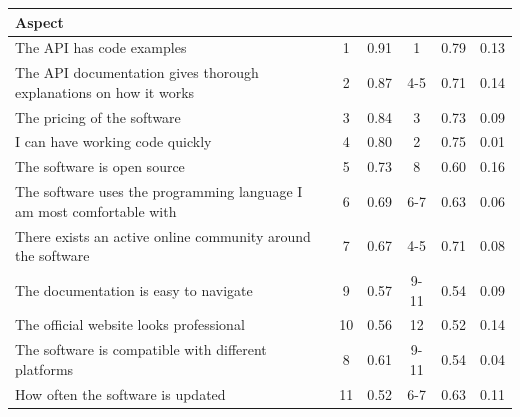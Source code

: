 \documentclass{article}
\begin{document}
\begin{table}[H]
\centering
\begin{tabularx}{\columnwidth}{X|c:c|c:c|c|}

\textbf{Aspect}                                                    &     & &   & & \\ \hline
The API has code examples                                             &               1 & 0.91       &            1 & 0.79           & 0.13  \\ \hline
The API documentation gives thorough explanations on how it works     &               2 & 0.87       &          4-5 & 0.71           & 0.14  \\ \hline
The pricing of the software                                           &               3 & 0.84       &            3 & 0.73           & 0.09  \\ \hline
I can have working code quickly                                       &               4 & 0.80       &            2 & 0.75           & 0.01  \\ \hline
The software is open source                                           &               5 & 0.73       &            8 & 0.60           & 0.16  \\ \hline
The software uses the programming language I am most comfortable with &               6 & 0.69       &          6-7 & 0.63           & 0.06  \\ \hline
There exists an active online community around the software           &               7 & 0.67       &          4-5 & 0.71           & 0.08  \\ \hline
The documentation is easy to navigate                                 &               9 & 0.57       &         9-11 & 0.54           & 0.09  \\ \hline
The official website looks professional                               &              10 & 0.56       &           12 & 0.52           & 0.14  \\ \hline
The software is compatible with different platforms                   &               8 & 0.61       &         9-11 & 0.54           & 0.04  \\ \hline
How often the software is updated                                     &              11 & 0.52       &          6-7 & 0.63           & 0.11  \\ \hline

\end{tabularx}
\end{table}
\end{document}

